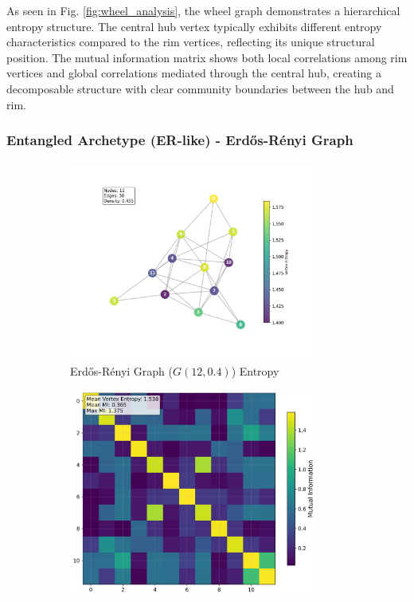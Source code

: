 \documentclass[12pt, letterpaper]{article}
\begin{document}
As seen in Fig. \ref{fig:wheel_analysis}, the wheel graph demonstrates a hierarchical entropy structure. The central hub vertex typically exhibits different entropy characteristics compared to the rim vertices, reflecting its unique structural position. The mutual information matrix shows both local correlations among rim vertices and global correlations mediated through the central hub, creating a decomposable structure with clear community boundaries between the hub and rim.

\subsubsection{Entangled Archetype (ER-like) - Erdős-Rényi Graph}

\begin{figure}[H]
    \centering
    \begin{subfigure}[b]{0.48\textwidth}
        \includegraphics[width=0.9\textwidth]{images/Graph Visualizations/Entangled/Erdos_Renyi_Vertex_Entropy.png}
        \caption{Erdős-Rényi Graph ($G(12,0.4)$) Entropy}
        \label{fig:erdos_entropy}
    \end{subfigure}
    \hfill
    \begin{subfigure}[b]{0.48\textwidth}
        \includegraphics[width=0.9\textwidth]{images/Graph Visualizations/Entangled/Erdos_Renyi_MI_Matrix.png}

\end{subfigure}
\end{figure}
\end{document}
